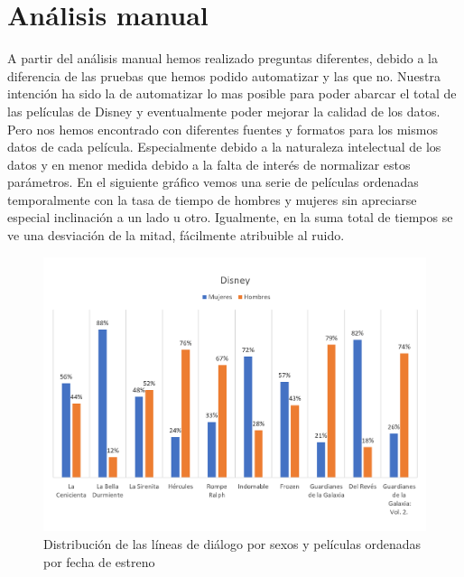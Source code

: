 \section{Análisis manual}
    A partir del análisis manual hemos realizado preguntas diferentes, debido a la diferencia de las pruebas que hemos podido automatizar y las que no. Nuestra intención ha sido la de automatizar lo mas posible para poder abarcar el total de las películas de Disney y eventualmente poder mejorar la calidad de los datos. Pero nos hemos encontrado con diferentes fuentes y formatos para los mismos datos de cada película. Especialmente debido a la naturaleza intelectual de los datos y en menor medida debido a la falta de interés de normalizar estos parámetros. En el siguiente gráfico vemos una serie de películas ordenadas temporalmente con la tasa de tiempo de hombres y mujeres sin apreciarse especial inclinación a un lado u otro. Igualmente, en la suma total de tiempos se ve una desviación de la mitad, fácilmente atribuible al ruido.
    \begin{figure}
        \centering
        \includegraphics[scale=0.7]{Images/peliculas.png}
        \caption{Distribución de las líneas de diálogo por sexos y películas ordenadas por fecha de estreno}
    \end{figure}
